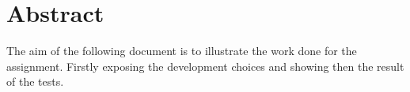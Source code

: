 \section{Abstract}
The aim of the following document is to illustrate the work done for the assignment. Firstly exposing the development choices and showing then the result of the tests.